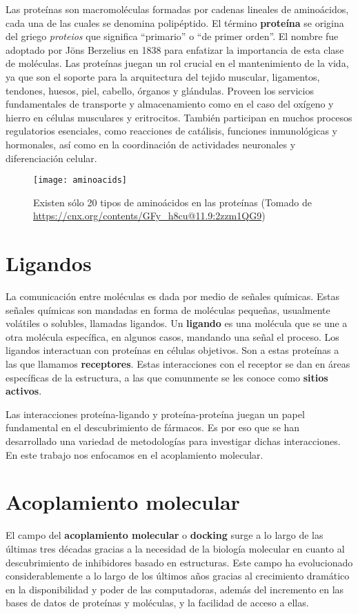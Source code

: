 Las proteínas son macromoléculas formadas por cadenas lineales de
aminoácidos, cada una de las cuales se denomina polipéptido. El
término \textbf{proteína} se origina del griego \textit{proteios} que
significa ``primario'' o ``de primer orden''. El nombre fue adoptado
por Jöns Berzelius en 1838 para enfatizar la importancia de esta clase
de moléculas. Las proteínas juegan un rol crucial en el mantenimiento
de la vida, ya que son el soporte para la arquitectura del tejido
muscular, ligamentos, tendones, huesos, piel, cabello, órganos y
glándulas. Proveen los servicios fundamentales de transporte y
almacenamiento como en el caso del oxígeno y hierro en células
musculares y eritrocitos. También participan en muchos procesos
regulatorios esenciales, como reacciones de catálisis, funciones
inmunológicas y hormonales, así como en la coordinación de actividades
neuronales y diferenciación celular.\cite{tamar}

\begin{figure}[H]
  \texttt{[image: aminoacids]} \centering
  \caption{Existen sólo 20 tipos de aminoácidos en las proteínas
  (Tomado de \url{https://cnx.org/contents/GFy_h8cu@11.9:2zzm1QG9})}
\end{figure}

\section{Ligandos}
La comunicación entre moléculas es dada por medio de señales químicas.
Estas señales químicas son mandadas en forma de moléculas pequeñas,
usualmente volátiles o solubles, llamadas ligandos.
Un \textbf{ligando} es una molécula que se une a otra molécula
específica, en algunos casos, mandando una señal el proceso. Los
ligandos interactuan con proteínas en células objetivos.  Son a estas
proteínas a las que llamamos \textbf{receptores}. Estas interacciones
con el receptor se dan en áreas específicas de la estructura, a las
que comunmente se les conoce como \textbf{sitios activos}.

Las interacciones proteína-ligando y proteína-proteína juegan un papel
fundamental en el descubrimiento de fármacos. Es por eso que se han
desarrollado una variedad de metodologías para investigar dichas
interacciones. En este trabajo nos enfocamos en el acoplamiento
molecular.

\section{Acoplamiento molecular}
El campo del \textbf{acoplamiento molecular} o
\textbf{docking} surge a lo largo de las últimas tres décadas gracias a la
necesidad de la biología molecular en cuanto al descubrimiento de
inhibidores basado en estructuras. Este campo ha evolucionado
considerablemente a lo largo de los últimos años gracias al
crecimiento dramático en la disponibilidad y poder de las
computadoras, además del incremento en las bases de datos de proteínas
y moléculas, y la facilidad de acceso a ellas.\cite{kukol}

